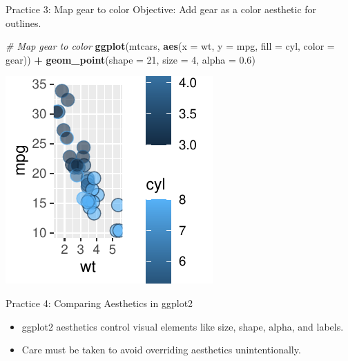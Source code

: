 \documentclass[
  ignorenonframetext,
]{beamer}
\newenvironment{Shaded}{\begin{snugshade}}{\end{snugshade}}
\newcommand{\AttributeTok}[1]{\textcolor[rgb]{0.13,0.29,0.53}{#1}}
\newcommand{\CommentTok}[1]{\textcolor[rgb]{0.56,0.35,0.01}{\textit{#1}}}
\newcommand{\DecValTok}[1]{\textcolor[rgb]{0.00,0.00,0.81}{#1}}
\newcommand{\FloatTok}[1]{\textcolor[rgb]{0.00,0.00,0.81}{#1}}
\newcommand{\FunctionTok}[1]{\textcolor[rgb]{0.13,0.29,0.53}{\textbf{#1}}}
\newcommand{\NormalTok}[1]{#1}
\newcommand{\SpecialCharTok}[1]{\textcolor[rgb]{0.81,0.36,0.00}{\textbf{#1}}}
\providecommand{\tightlist}{%
  \setlength{\itemsep}{0pt}\setlength{\parskip}{0pt}}
\begin{document}
\begin{frame}[fragile]{Practice 3: Map gear to color}
\label{practice-3-map-gear-to-color}
Objective: Add gear as a color aesthetic for outlines.


\begin{Shaded}
\begin{Highlighting}[]
\CommentTok{\# Map gear to color}
\FunctionTok{ggplot}\NormalTok{(mtcars, }\FunctionTok{aes}\NormalTok{(}\AttributeTok{x =}\NormalTok{ wt, }\AttributeTok{y =}\NormalTok{ mpg, }\AttributeTok{fill =}\NormalTok{ cyl, }\AttributeTok{color =}\NormalTok{ gear)) }\SpecialCharTok{+}
    \FunctionTok{geom\_point}\NormalTok{(}\AttributeTok{shape =} \DecValTok{21}\NormalTok{, }\AttributeTok{size =} \DecValTok{4}\NormalTok{, }\AttributeTok{alpha =} \FloatTok{0.6}\NormalTok{)}
\end{Highlighting}
\end{Shaded}

\begin{center}\includegraphics[width=0.5\linewidth]{Figs/unnamed-chunk-16-1} \end{center}
\end{frame}

\begin{frame}{Practice 4: Comparing Aesthetics in ggplot2}
\label{practice-4-comparing-aesthetics-in-ggplot2}
\begin{itemize}
\tightlist
\item
  ggplot2 aesthetics control visual elements like size, shape, alpha,
  and labels.
\item
  Care must be taken to avoid overriding aesthetics unintentionally.
\end{itemize}
\end{frame}
\end{document}
